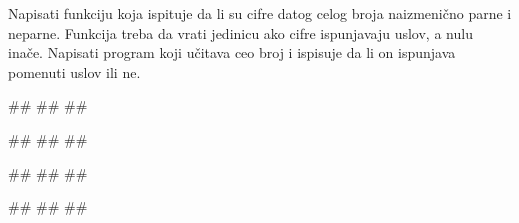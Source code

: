 \begin{Exercise}[label=FUN_17] 
Napisati funkciju  koja ispituje da li su
cifre datog celog broja naizmenično parne i neparne. Funkcija treba da
vrati jedinicu ako cifre ispunjavaju uslov, a nulu inače. 
Napisati program koji učitava ceo broj i ispisuje da li on ispunjava
pomenuti uslov ili ne.
  
\begin{miditest}
\begin{upotreba}{1}
#\naslovInt#
##
##
\end{upotreba}
\end{miditest}
\begin{miditest}
\begin{upotreba}{2}
#\naslovInt#
##
##
\end{upotreba}
\end{miditest}

\begin{miditest}
\begin{upotreba}{3}
#\naslovInt#
##
##
\end{upotreba}
\end{miditest}
\begin{miditest}
\begin{upotreba}{4}
#\naslovInt#
##
##
\end{upotreba}
\end{miditest}

\end{Exercise}
\ifresenja 
\begin{Answer}[ref=FUN_17]
\end{Answer} 
\fi



